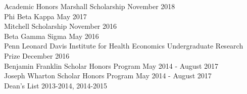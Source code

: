 \documentclass{resume} %
\begin{document}
\begin{rSection}{Academic Honors}
{Marshall Scholarship} \hfill {November 2018}\\
{Phi Beta Kappa} \hfill {May 2017}\\
{Mitchell Scholarship} \hfill {November 2016}\\
{Beta Gamma Sigma} \hfill {May 2016}\\
{Penn Leonard Davis Institute for Health Economics Undergraduate Research Prize} \hfill {December 2016}\\
{Benjamin Franklin Scholar Honors Program} \hfill {May 2014 - August 2017}\\
{Joseph Wharton Scholar Honors Program} \hfill {May 2014 - August 2017}\\
{Dean's List} \hfill {2013-2014, 2014-2015}
\end{rSection}
\end{document}
